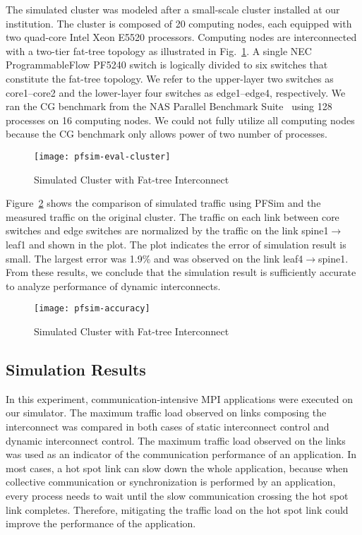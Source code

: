 The simulated cluster was modeled after a small-scale cluster installed at our
institution. The cluster is composed of 20 computing nodes, each equipped with
two quad-core Intel Xeon E5520 processors. Computing nodes are interconnected
with a two-tier fat-tree topology as illustrated in
Fig.~\ref{fig:cluster-config}. A single NEC ProgrammableFlow PF5240 switch is
logically divided to six switches that constitute the fat-tree topology.
We refer to the upper-layer two switches as core1--core2 and the lower-layer
four switches as edge1--edge4, respectively. We ran the CG benchmark from the
NAS Parallel Benchmark Suite~\autocite{Bailey1991} using 128 processes on 16
computing nodes. We could not fully utilize all computing nodes because the CG
benchmark only allows power of two number of processes.

\begin{figure}
    \centering
    \texttt{[image: pfsim-eval-cluster]}
    \caption{Simulated Cluster with Fat-tree Interconnect}%
    \label{fig:cluster-config}
\end{figure}

Figure~\ref{fig:pfsim-accuracy} shows the comparison of simulated traffic
using PFSim and the measured traffic on the original cluster. The traffic on
each link between core switches and edge switches are normalized by the
traffic on the link spine1$\rightarrow$leaf1 and shown in the plot. The plot
indicates the error of simulation result is small. The largest error was 1.9\%
and was observed on the link leaf4$\rightarrow$spine1. From these results, we
conclude that the simulation result is sufficiently accurate to analyze
performance of dynamic interconnects.

\begin{figure}
    \centering
    \texttt{[image: pfsim-accuracy]}
    \caption{Simulated Cluster with Fat-tree Interconnect}%
    \label{fig:pfsim-accuracy}
\end{figure}

\subsection{Simulation Results}\label{sec:ii-simulation-results}

In this experiment, communication-intensive MPI applications were
executed on our simulator. The maximum traffic load observed on links
composing the interconnect was compared in both cases of static
interconnect control and dynamic interconnect control. The maximum
traffic load observed on the links was used as an indicator of the
communication performance of an application. In most cases, a hot spot
link can slow down the whole application, because when collective
communication or synchronization is performed by an application, every
process needs to wait until the slow communication crossing the hot spot
link completes. Therefore, mitigating the traffic load on the hot spot
link could improve the performance of the application.

